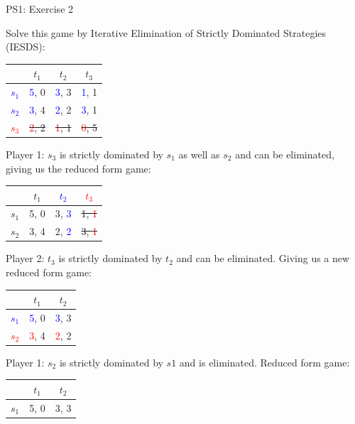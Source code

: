 \begin{frame}{PS1: Exercise 2}
\begin{multicols}{2}
Solve this game by Iterative Elimination of Strictly Dominated Strategies (IESDS):
\begin{table}
  \begin{tabular}{c|c|c|c}
          & $t_1$ & $t_2$ & $t_3$ \\
    \midrule
    \textcolor{blue}{$s_1$} & \textcolor{blue}{5}, 0  & \textcolor{blue}{3}, 3  & \textcolor{blue}{1}, 1 \\
    \midrule
    \textcolor{blue}{$s_2$} & \textcolor{blue}{3}, 4  & \textcolor{blue}{2}, 2  & \textcolor{blue}{3}, 1 \\
    \midrule
    \sout{\textcolor{red}{$s_3$}} & \sout{\textcolor{red}{2}, 2}  & \sout{\textcolor{red}{1}, 1}  & \sout{\textcolor{red}{0}, 5}
  \end{tabular}
\end{table}
Player 1: $s_3$ is strictly dominated by $s_1$ as well as $s_2$ and can be eliminated, giving us the reduced form game:
\begin{table}
  \begin{tabular}{c|c|c|c}
          & $t_1$ & \textcolor{blue}{$t_2$} & \sout{\textcolor{red}{$t_3$}} \\
    \midrule
    $s_1$ & 5, 0  & 3, \textcolor{blue}{3}  & \sout{1, \textcolor{red}{1}} \\
    \midrule
    $s_2$ & 3, 4  & 2, \textcolor{blue}{2}  & \sout{3, \textcolor{red}{1}}
  \end{tabular}
\end{table}
Player 2: $t_3$ is strictly dominated by $t_2$ and can be eliminated.
\vfill\null
\columnbreak
Giving us a new reduced form game:
\begin{table}
  \begin{tabular}{c|c|c}
          & $t_1$ & $t_2$ \\
    \midrule
    \textcolor{blue}{$s_1$} & \textcolor{blue}{5}, 0  & \textcolor{blue}{3}, 3  \\
    \midrule
    \textcolor{red}{$s_2$} & \textcolor{red}{3}, 4  & \textcolor{red}{2}, 2
  \end{tabular}
\end{table}
Player 1: $s_2$ is strictly dominated by $s1$ and is eliminated. Reduced form game:
\begin{table}
  \begin{tabular}{c|c|c}
          & $t_1$ & $t_2$ \\
    \midrule
    $s_1$ & 5, 0  & 3, 3
  \end{tabular}
\end{table}
\vfill\null
\end{multicols}
\end{frame}

